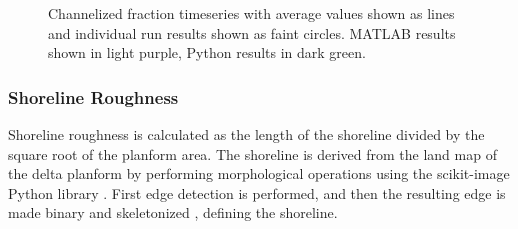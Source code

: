 \begin{figure}[!htbp]
	\caption{Channelized fraction timeseries with average values shown as lines and individual run results shown as faint circles. MATLAB results shown in light purple, Python results in dark green.}
	\label{fig:channelfraction}
\end{figure}

\subsubsection{Shoreline Roughness}
Shoreline roughness is calculated as the length of the shoreline divided by the square root of the planform area.
The shoreline is derived from the land map of the delta planform by performing morphological operations using the scikit-image Python library \cite{scikit-image}.
First edge detection \cite{roberts1963machine} is performed, and then the resulting edge is made binary and skeletonized \cite{zhang1984fast}, defining the shoreline.

